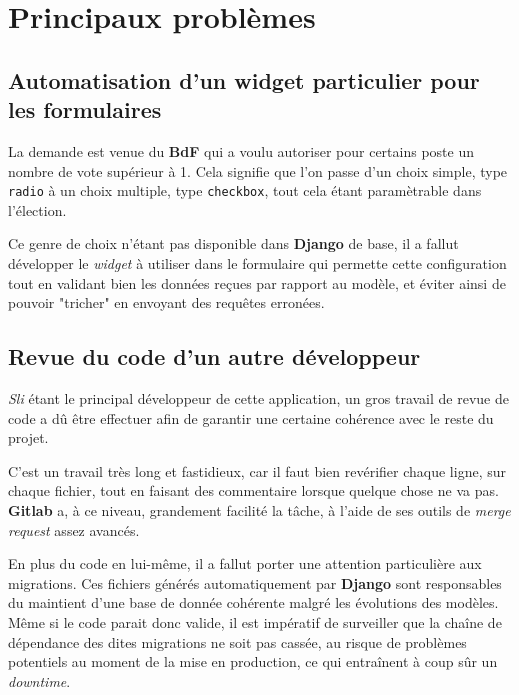 \documentclass[a4paper]{report}
\begin{document}
\section{Principaux problèmes}
\label{sec:principaux_problemes}

\subsection{Automatisation d'un widget particulier pour les formulaires}
\label{sub:automatisation_d_un_widget_particulier_pour_les_formulaires}
\par La demande est venue du \textbf{BdF} qui a voulu autoriser pour certains poste un nombre de vote supérieur à 1.
Cela signifie que l'on passe d'un choix simple, type \verb#radio# à un choix multiple, type \verb#checkbox#, tout cela
étant paramètrable dans l'élection.

\par Ce genre de choix n'étant pas disponible dans \textbf{Django} de base, il a fallut développer le \emph{widget} à
utiliser dans le formulaire qui permette cette configuration tout en validant bien les données reçues par rapport au
modèle, et éviter ainsi de pouvoir "tricher" en envoyant des requêtes erronées.

\subsection{Revue du code d'un autre développeur}
\label{sub:revue_du_code_d_un_autre_developpeur}
\par \emph{Sli} étant le principal développeur de cette application, un gros travail de revue de code a dû être
effectuer afin de garantir une certaine cohérence avec le reste du projet.

\par C'est un travail très long et fastidieux, car il faut bien revérifier chaque ligne, sur chaque fichier, tout en
faisant des commentaire lorsque quelque chose ne va pas. \textbf{Gitlab} a, à ce niveau, grandement facilité la tâche, à
l'aide de ses outils de \emph{merge request} assez avancés.

\par En plus du code en lui-même, il a fallut porter une attention particulière aux migrations. Ces fichiers générés
automatiquement par \textbf{Django} sont responsables du maintient d'une base de donnée cohérente malgré les évolutions
des modèles. Même si le code parait donc valide, il est impératif de surveiller que la chaîne de dépendance des dites
migrations ne soit pas cassée, au risque de problèmes potentiels au moment de la mise en production, ce qui entraînent à
coup sûr un \emph{downtime}.
\end{document}
